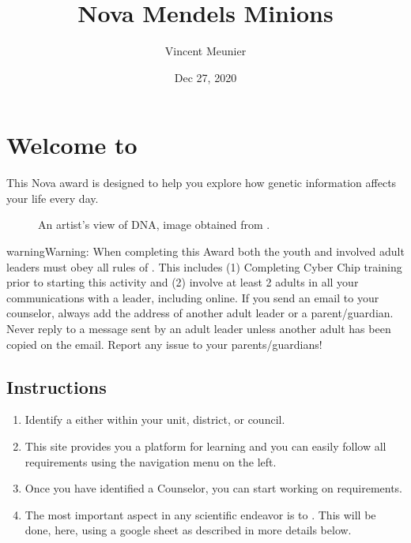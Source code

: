 \documentclass[letterpaper,10pt,english,openany,oneside]{sphinxmanual}
\title{Nova \sphinxhyphen{} Mendel\textquotesingle{}s Minions}
\date{Dec 27, 2020}
\author{Vincent Meunier}
\let\sphinxpxdimen\pdfpxdimen\else\newdimen\sphinxpxdimen
\begin{document}
\pagestyle{empty}
\sphinxmaketitle
\pagestyle{plain}
\sphinxtableofcontents
\pagestyle{normal}
\label{\detokenize{index::doc}}



\chapter{Welcome to }
\label{\detokenize{introduction:welcome-to-mendel-s-minions}}\label{\detokenize{introduction:introduction}}\label{\detokenize{introduction::doc}}
This Nova award is designed to help you explore how genetic information affects your life every day.

\begin{figure}[htbp]
\centering
\capstart

\noindent\sphinxincludegraphics[width=400\sphinxpxdimen]{{dna}.jpg}
\caption{An artist’s view of DNA, image obtained from .}\label{\detokenize{introduction:id1}}\end{figure}

\begin{sphinxadmonition}{warning}{Warning:}
When completing this Award both the youth and involved adult leaders must obey all rules of . This includes (1) Completing Cyber Chip training prior to starting this activity and (2)  involve at least 2 adults in all your communications with a leader, including online. If you send an email to your counselor, always add the address of another adult leader or a parent/guardian. Never reply to a message sent by an adult leader unless another adult has been copied on the email. Report any issue to your parents/guardians!
\end{sphinxadmonition}


\section{Instructions}
\label{\detokenize{introduction:instructions}}\begin{enumerate}
%
\item {} 
Identify a  either within your unit, district, or council.

\item {} 
This site provides you a platform for learning and you can easily follow all requirements using the navigation menu on the left.

\item {} 
Once you have identified a Counselor, you can start working on requirements.

\item {} 
The most important aspect in any scientific endeavor is to . This will be done, here, using a google sheet as described in more details below.

\end{enumerate}
\end{document}
